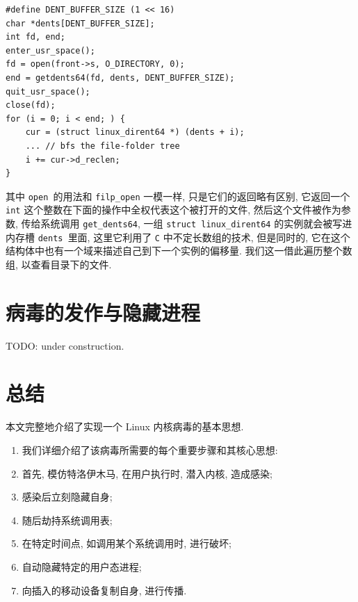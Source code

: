 \documentclass[11pt,fleqn]{book} %
\begin{document}
\vspace*{0.5cm}

\begin{lstlisting}
#define DENT_BUFFER_SIZE (1 << 16)
char *dents[DENT_BUFFER_SIZE];
int fd, end;
enter_usr_space();
fd = open(front->s, O_DIRECTORY, 0);
end = getdents64(fd, dents, DENT_BUFFER_SIZE);
quit_usr_space();
close(fd);
for (i = 0; i < end; ) {
	cur = (struct linux_dirent64 *) (dents + i);
	... // bfs the file-folder tree
	i += cur->d_reclen;
}
\end{lstlisting}


\vspace*{0.5cm}

其中 \texttt{open }的用法和 \texttt{filp\_open} 一模一样, 只是它们的返回略有区别, 它返回一个
\texttt{int} 这个整数在下面的操作中全权代表这个被打开的文件, 然后这个文件被作为参数, 传给系统调用 \texttt{get\_dents64},
 一组 \texttt{struct linux\_dirent64} 的实例就会被写进内存槽 \texttt{dents }里面,
这里它利用了 \texttt{C} 中不定长数组的技术, 但是同时的, 它在这个 结构体中也有一个域来描述自己到下一个实例的偏移量.
我们这一借此遍历整个数组, 以查看目录下的文件. 

\newpage{}


\chapter{病毒的发作与隐藏进程}



TODO: under construction.



\newpage{}


\chapter{总结}



本文完整地介绍了实现一个 Linux 内核病毒的基本思想.
\begin{enumerate}
\item 我们详细介绍了该病毒所需要的每个重要步骤和其核心思想:
\item 首先, 模仿特洛伊木马, 在用户执行时, 潜入内核, 造成感染;
\item 感染后立刻隐藏自身;
\item 随后劫持系统调用表;
\item 在特定时间点, 如调用某个系统调用时, 进行破坏;
\item 自动隐藏特定的用户态进程;
\item 向插入的移动设备复制自身, 进行传播.
\end{enumerate}
\end{document}
